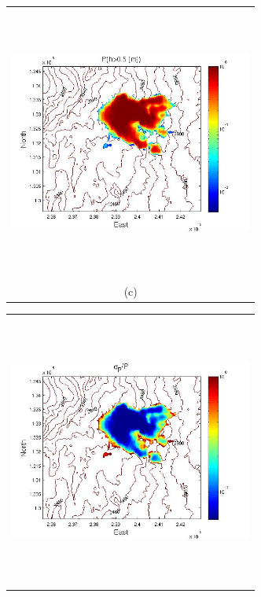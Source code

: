 \documentclass{article}
\newcommand{\Pic}[2][0.85]{\begin{center}\texttt{[image: \#2]}
 \end{center} }
\begin{document}
\begin{figure}[H]
\begin{minipage}{0.6\textwidth}
\begin{tabular}{c}
        \end{tabular}
    \end{minipage} 
        \begin{minipage}[b]{0.6\textwidth}
        \begin{tabular}{c}
       \includegraphics[width=8cm,height=9cm,keepaspectratio]{figs/Galeras_3_P_5m.jpg}\\
        (c)
        \end{tabular}
    \end{minipage}
    \begin{minipage}{0.6\textwidth}
        \begin{tabular}{c}
	\includegraphics[width=8cm,height=9cm,keepaspectratio]{figs/Galeras_3_sigma_5m.jpg}\\

\end{tabular}
\end{minipage}
\end{figure}
\end{document}
